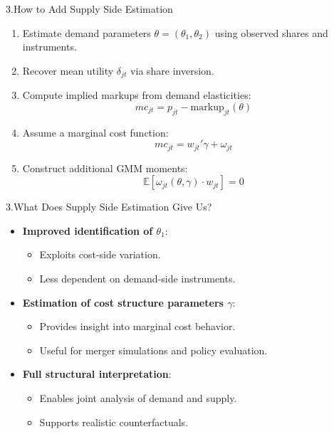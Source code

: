 \documentclass[aspectratio=169]{beamer}  %
\begin{document}
\begin{frame}{3.How to Add Supply Side Estimation}
\begin{enumerate}
    \item Estimate demand parameters \( \theta = (\theta_1, \theta_2) \) using observed shares and instruments.
    \item Recover mean utility \( \delta_{jt} \) via share inversion.
    \item Compute implied markups from demand elasticities:
    \[
    mc_{jt} = p_{jt} - \text{markup}_{jt}(\theta)
    \]
    \item Assume a marginal cost function:
    \[
    mc_{jt} = w_{jt}' \gamma + \omega_{jt}
    \]
    \item Construct additional GMM moments:
    \[
    \mathbb{E}[\omega_{jt}(\theta, \gamma) \cdot w_{jt}] = 0
    \]
\end{enumerate}
\end{frame}

\begin{frame}{3.What Does Supply Side Estimation Give Us?}
\begin{itemize}
    \item \textbf{Improved identification of \(\theta_1\)}:
    \begin{itemize}
        \item Exploits cost-side variation.
        \item Less dependent on demand-side instruments.
    \end{itemize}
    \item \textbf{Estimation of cost structure parameters \(\gamma\)}:
    \begin{itemize}
        \item Provides insight into marginal cost behavior.
        \item Useful for merger simulations and policy evaluation.
    \end{itemize}
    \item \textbf{Full structural interpretation}:
    \begin{itemize}
        \item Enables joint analysis of demand and supply.
        \item Supports realistic counterfactuals.
    \end{itemize}
\end{itemize}
\end{frame}

\end{document}
